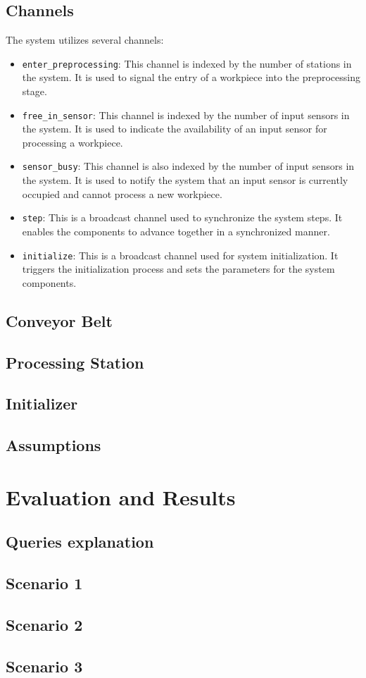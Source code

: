 \documentclass[11pt, oneside]{article}
\begin{document}
\subsection{Channels}
The system utilizes several channels:
\begin{itemize}
\item \texttt{enter\_preprocessing}: This channel is indexed by the number of stations in the system. It is used to signal the entry of a workpiece into the preprocessing stage.
\item \texttt{free\_in\_sensor}: This channel is indexed by the number of input sensors in the system. It is used to indicate the availability of an input sensor for processing a workpiece.
\item \texttt{sensor\_busy}: This channel is also indexed by the number of input sensors in the system. It is used to notify the system that an input sensor is currently occupied and cannot process a new workpiece.
\item \texttt{step}: This is a broadcast channel used to synchronize the system steps. It enables the components to advance together in a synchronized manner.
\item \texttt{initialize}: This is a broadcast channel used for system initialization. It triggers the initialization process and sets the parameters for the system components.
\end{itemize}



\subsection{Conveyor Belt}
\subsection{Processing Station}
\subsection{Initializer}
\subsection{Assumptions}

\section{Evaluation and Results}
\subsection{Queries explanation}
\subsection{Scenario 1}
\subsection{Scenario 2}
\subsection{Scenario 3}

\end{document}
